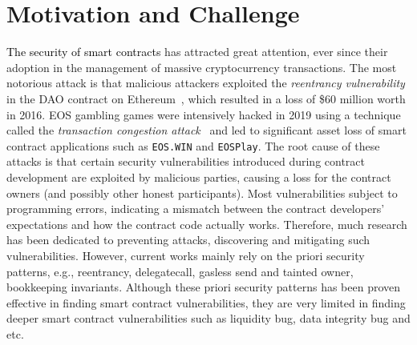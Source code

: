 \section{Motivation and Challenge}


\textcolor{black}{The security of smart contracts} has attracted great attention, ever since their adoption in the management of massive cryptocurrency transactions.
The most notorious attack is that malicious attackers exploited the \emph{reentrancy vulnerability} in the DAO contract on Ethereum~\cite{DAO_attacks}, which resulted in
a loss of \$60 million worth in 2016.
EOS gambling games were intensively hacked in 2019 using a technique called the \emph{transaction congestion attack}~\cite{EOS_attacks} and led
to significant asset loss of smart contract applications such as \texttt{EOS.WIN} and \texttt{EOSPlay}.
The root cause of these attacks is that certain security vulnerabilities introduced during contract development are exploited by malicious parties, causing a loss for the contract owners (and possibly other honest participants).
Most vulnerabilities subject to programming errors, indicating a mismatch between the contract developers' expectations and how the contract code actually works.
Therefore, much research has been dedicated to preventing attacks, discovering and mitigating such vulnerabilities.
However, current works mainly rely on the priori security patterns, e.g., reentrancy, delegatecall, gasless send and tainted owner, bookkeeping invariants.
Although these priori security patterns has been proven effective in finding smart contract vulnerabilities,
they are very limited in finding deeper smart contract vulnerabilities such as liquidity bug, data integrity bug and etc.

